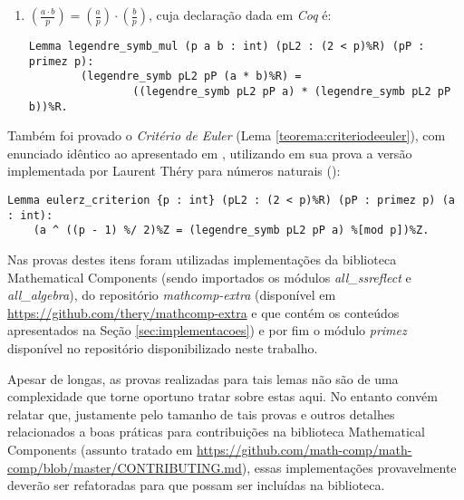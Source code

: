 \begin{enumerate}

        
        \item $\left(\frac{a \cdot b}{p}\right) = \left(\frac{a}{p}\right) \cdot \left(\frac{b}{p}\right)$, cuja declaração dada em \textit{Coq} é:
        \newline
                \begin{lstlisting}[language=coq,frame=single,tabsize=1]
Lemma legendre_symb_mul (p a b : int) (pL2 : (2 < p)%R) (pP : primez p):
        (legendre_symb pL2 pP (a * b)%R) = 
                ((legendre_symb pL2 pP a) * (legendre_symb pL2 pP b))%R.
                \end{lstlisting}
        \end{enumerate}
        Também foi provado o \textit{Critério de Euler} (Lema \ref{teorema:criteriodeeuler}), com enunciado idêntico ao apresentado em \cite[p.~87]{book:2399854}, utilizando em sua prova a versão implementada por Laurent Théry para números naturais ():
        \begin{lstlisting}[language=coq,frame=single,tabsize=1]
Lemma eulerz_criterion {p : int} (pL2 : (2 < p)%R) (pP : primez p) (a : int):
    (a ^ ((p - 1) %/ 2)%Z = (legendre_symb pL2 pP a) %[mod p])%Z.
        \end{lstlisting}

        Nas provas destes itens foram utilizadas implementações da biblioteca Mathematical Components (sendo importados os módulos \textit{all\_ssreflect} e \textit{all\_algebra}), do repositório \textit{mathcomp-extra} (disponível em \url{https://github.com/thery/mathcomp-extra} e que contém os conteúdos apresentados na Seção \ref{sec:implementacoes}) e por fim o módulo \textit{primez} disponível no repositório disponibilizado neste trabalho.

        Apesar de longas, as provas realizadas para tais lemas não são de uma complexidade que torne oportuno tratar sobre estas aqui. No entanto convém relatar que, justamente pelo tamanho de tais provas e outros detalhes relacionados a boas práticas para contribuições na biblioteca Mathematical Components (assunto tratado em \url{https://github.com/math-comp/math-comp/blob/master/CONTRIBUTING.md}), essas implementações provavelmente deverão ser refatoradas para que possam ser incluídas na biblioteca.


